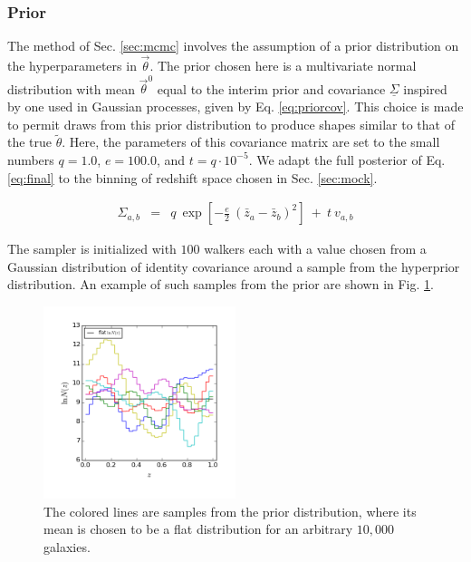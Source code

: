 \documentclass[preprint]{aastex}
\newcommand{\textul}{\underline}
\begin{document}
\clearpage
\subsubsection{Prior}
\label{sec:prior}

The method of Sec. \ref{sec:mcmc} involves the assumption of a prior 
distribution on the hyperparameters in $\vec{\theta}$.  The prior chosen here 
is a multivariate normal distribution with mean $\vec{\theta}^{0}$ equal to the 
interim prior and covariance $\textul{\Sigma}$ inspired by one used in Gaussian 
processes, given by Eq. \ref{eq:priorcov}.  This choice is made to permit draws 
from this prior distribution to produce shapes similar to that of the true 
$\tilde{\theta}$.  Here, the parameters of this covariance matrix are set to 
the small numbers $q=1.0$, $e=100.0$, and $t=q\cdot10^{-5}$.  We adapt the full 
posterior of Eq. \ref{eq:final} to the binning of redshift space chosen in Sec. 
\ref{sec:mock}.

\begin{eqnarray}
\label{eq:priorcov}
\Sigma_{a,b} &=& q\ \exp[-\frac{e}{2}\ (\bar{z}_{a}-\bar{z}_{b})^{2}]\ +\ t\ 
v_{a,b}
\end{eqnarray}

The sampler is initialized with $100$ walkers each with a value chosen from a 
Gaussian distribution of identity covariance around a sample from the 
hyperprior distribution.  An example of such samples from the prior are shown 
in Fig. \ref{fig:prior}.

\begin{figure}
\includegraphics[width=0.5\textwidth]{figs/priorsamps.png}
\caption{The colored lines are samples from the prior distribution, where its 
mean is chosen to be a flat distribution for an arbitrary $10,000$ galaxies.}
\label{fig:prior}
\end{figure}
\end{document}
